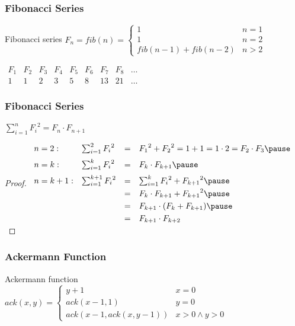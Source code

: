 \documentclass[dvipsnames]{beamer}
\begin{document}
\begin{frame}
  \frametitle{Fibonacci Series}

  \begin{block}{Fibonacci series}
    $F_n = fib(n) = \left\{
      \begin{array}{ll}
        1                   & n = 1\\
        1                   & n = 2\\
        fib(n-1) + fib(n-2) & n > 2
      \end{array}
    \right.$
  \end{block}

  \pause
  \bigskip
  $\begin{array}{ccccccccc}
     F_1 & F_2 & F_3 & F_4 & F_5 & F_6 & F_7 & F_8 & \dots\\
     1   & 1   & 2   & 3   & 5   & 8   & 13  & 21  & \dots
  \end{array}$
\end{frame}

\begin{frame}
  \frametitle{Fibonacci Series}

  \begin{theorem}
    $\sum_{i=1}^{n} {F_i}^2 = F_n \cdot F_{n+1}$
  \end{theorem}

  \pause
  \begin{proof}
    $\begin{array}{llcl}
      n=2:   & \sum_{i=1}^{2} {F_i}^2   & = & {F_1}^2+{F_2}^2=1+1=1 \cdot 2=F_2 \cdot F_3
      \pause
      \medskip\\
      n=k:   & \sum_{i=1}^{k} {F_i}^2   & = & F_k \cdot F_{k+1}
      \pause
      \medskip\\
      n=k+1: & \sum_{i=1}^{k+1} {F_i}^2 & = & \sum_{i=1}^{k} {F_i}^2 + {F_{k+1}}^2
      \pause
      \smallskip\\
             &                          & = & F_k \cdot F_{k+1} + {F_{k+1}}^2
      \pause
      \smallskip\\
             &                          & = & F_{k+1} \cdot (F_k + F_{k+1})
      \pause
      \smallskip\\
             &                          & = & F_{k+1} \cdot F_{k+2}
    \end{array}$
  \end{proof}
\end{frame}

\begin{frame}
  \frametitle{Ackermann Function}

  \begin{block}{Ackermann function}
    $ack(x,y) = \left\{
      \begin{array}{ll}
        y+1                 & x = 0\\
        ack(x-1, 1)         & y = 0\\
        ack(x-1,ack(x,y-1)) & x > 0 \wedge y > 0
      \end{array}
    \right.$
  \end{block}
\end{frame}
\end{document}
